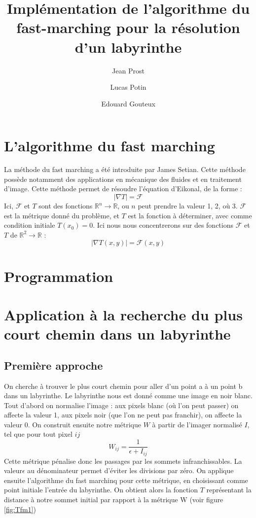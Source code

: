 \documentclass{article}
\title{Implémentation de l'algorithme du fast-marching pour la résolution d'un labyrinthe}
\author{Jean Prost \and Lucas Potin \and Edouard Gouteux}
\begin{document}
	
\maketitle
	
\section{L'algorithme du fast marching}

La méthode du fast marching a été introduite par James Setian. Cette méthode possède notamment des applications en mécanique des fluides et en traitement d'image. Cette méthode permet de résoudre l'équation d'Eikonal, de la forme :
\begin{equation}
|\nabla T|=\mathcal{F}
\end{equation}
Ici, $ \mathcal{F}$ et $T$ sont des fonctions $\mathbb{R}^n \to \mathbb{R}$, ou $n$ peut prendre la valeur 1, 2, où 3. $\mathcal{F}$ est la métrique donné du problème, et $T$ est la fonction à déterminer, avec comme condition initiale $T(x_0) = 0$. Ici nous nous concentrerons sur des fonctions $ \mathcal{F}$ et $T$ de $\mathbb{R}^2 \to \mathbb{R}$ :
\begin{equation}
|\nabla T(x,y)|=\mathcal{F}(x,y)
\end{equation}


\section{Programmation}

\section{Application à la recherche du plus court chemin dans un labyrinthe}
\subsection{Première approche}
On cherche à trouver le plus court chemin pour aller d'un point a à un point b dans un labyrinthe. Le labyrinthe nous est donné comme une image en noir blanc. Tout d'abord on normalise l'image : aux pixels blanc (où l'on peut passer) on affecte la valeur 1, aux pixels noir (que l'on ne peut pas franchir), on affecte la valeur 0. On construit ensuite notre métrique $W$ à partir de l'imager normalisé $I$, tel que pour tout pixel $ij$
\begin{equation}
W_{ij}  = \frac{1}{\epsilon+I_{ij}}
\end{equation}
Cette métrique pénalise donc les passages par les sommets infranchissables. La valeur$\epsilon$ au dénominateur permet d'éviter les divisions par zéro.
On applique ensuite l'algorithme du fast marchinq pour cette métrique, en choisissant comme point initiale l'entrée du labyrinthe. On obtient alors la fonction $T$ représentant la distance à notre sommet initial par rapport à la métrique W (voir figure \ref{fig:Tfm1})
\end{document}
